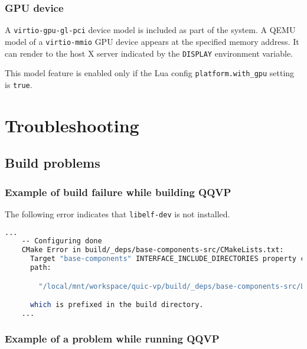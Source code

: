 \subsection{GPU device}

A {\small{\lstinline!virtio-gpu-gl-pci!}} device model is included as part
of the system. A QEMU model of a {\small{\lstinline!virtio-mmio!}} GPU
device appears at the specified memory address.  It can render to the host
X server indicated by the {\small{\lstinline!DISPLAY!}} environment variable.

This model feature is enabled only if the Lua config
{\small{\lstinline!platform.with_gpu!}} setting is {\small{\lstinline!true!}}.

\chapter{Troubleshooting}

\section{Build problems}

\subsection{Example of build failure while building QQVP}

The following error indicates that {\small{\lstinline!libelf-dev!}} is not installed.

\small
\begin{lstlisting}[language=bash]
    ...
    -- Configuring done
    CMake Error in build/_deps/base-components-src/CMakeLists.txt:
      Target "base-components" INTERFACE_INCLUDE_DIRECTORIES property contains
      path:

        "/local/mnt/workspace/quic-vp/build/_deps/base-components-src/LIBELF_INCLUDE_DIRS-NOTFOUND"

      which is prefixed in the build directory.
    ...
\end{lstlisting}
\normalsize


\subsection{Example of a problem while running QQVP}

